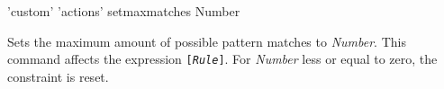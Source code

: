 \begin{rail}
  'custom' 'actions' setmaxmatches Number
\end{rail}
Sets the maximum amount of possible pattern matches to \emph{Number}. This command affects the expression \texttt{[\emph{Rule}]}. For \emph{Number} less or equal to zero, the constraint is reset.
